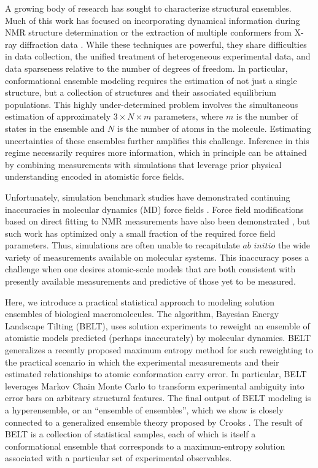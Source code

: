 \documentclass[journal=jacsat,manuscript=article]{achemso}
\begin{document}
A growing body of research has sought to characterize structural ensembles.  Much of this work has focused on incorporating dynamical information during NMR structure determination  \cite{lindorff2005simultaneous, lange2008recognition} or the extraction of multiple conformers from X-ray diffraction data  \cite{depristo2004heterogeneity, lang2010automated}.  While these techniques are powerful, they share difficulties in data collection, the unified treatment of heterogeneous experimental data, and data sparseness relative to the number of degrees of freedom.  In particular, conformational ensemble modeling requires the estimation of not just a single structure, but a collection of structures and their associated equilibrium populations.  This highly under-determined problem involves the simultaneous estimation of approximately $3 \times N \times m$ parameters, where $m$ is the number of states in the ensemble and $N$ is the number of atoms in the molecule. Estimating uncertainties of these ensembles further 
amplifies this challenge.  Inference in this regime necessarily requires more information, which in principle can be attained by combining measurements with simulations that leverage prior physical understanding encoded in atomistic force fields. 

Unfortunately, simulation benchmark studies have demonstrated continuing inaccuracies in molecular dynamics (MD) force fields \cite{best2008, lindorff2012systematic, beauchamp2012protein}.  Force field modifications based on direct fitting to NMR measurements have also been demonstrated \cite{li2011iterative, best2012optimization, nerenberg2011}, but such work has optimized only a small fraction of the required force field parameters.  Thus, simulations are often unable to recapitulate $ab$ $initio$ the wide variety of measurements available on molecular systems.  This inaccuracy poses a challenge when one desires atomic-scale models that are both consistent with presently available measurements and predictive of those yet to be measured.  

Here, we introduce a practical statistical approach to modeling solution ensembles of biological macromolecules.  The algorithm, Bayesian Energy Landscape Tilting (BELT), uses solution experiments to reweight an ensemble of atomistic models predicted (perhaps inaccurately) by molecular dynamics.  BELT generalizes a recently proposed maximum entropy method for such reweighting \cite{chodera2012} to the practical scenario in which the experimental measurements and their estimated relationships to atomic conformation carry error. In particular, BELT leverages Markov Chain Monte Carlo \cite{patil2010pymc} to transform experimental ambiguity into error bars on arbitrary structural features. The final output of BELT modeling is a hyperensemble, or an ``ensemble of ensembles'', which we show is closely connected to a generalized ensemble theory proposed by Crooks \cite{crooks2007beyond}. The result of BELT is a collection of statistical samples, each of which is itself a conformational ensemble that corresponds to 
a maximum-entropy solution associated with a particular set of experimental observables. 
\end{document}
